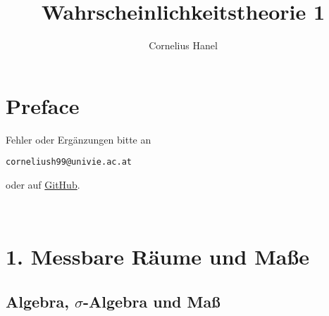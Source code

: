 \documentclass[12pt]{report}
\title{Wahrscheinlichkeitstheorie 1}
\author{Cornelius Hanel}
\begin{document}
\maketitle

\chapter*{Preface}
Fehler oder Erg\"anzungen bitte an
\newline
\begin{center}
    \texttt{corneliush99@univie.ac.at}
\end{center}
oder auf \href{https://github.com/cornelius-qq/probtheory1}{GitHub}.

\tableofcontents


\newcommand{\E}{\mathbb{E}}
\newcommand{\cR}{\mathcal{R}}
\newcommand{\cB}{\mathcal{B}}
\newcommand{\C}{\mathbb{C}}
\newcommand{\del}{\partial}
\newcommand{\A}{\mathcal{A}}
\newcommand{\M}{\mathcal{M}}
\newcommand{\G}{\mathcal{G}}
\renewcommand{\geq}{\geqslant}
\renewcommand{\leq}{\leqslant}
\newcommand{\eps}{\varepsilon}
\newcommand{\Pp}{\mathbb{P}}
\newcommand{\R}{\mathbb{R}}
\newcommand{\Var}{\operatorname{Var}}
\newcommand{\pspace}{(\Omega, \mathcal{A}, \Pp)}
\newcommand{\borel}{\mathcal{B}(\R)}
\newcommand{\ind}[1]{\mathds{1}_{#1}}
\newcommand{\nto}[2]{\xrightarrow[#2]{\makebox[1.5em][c]{$\scriptstyle#1$}}}‌
\newcommand{\krestr}[1]{%
  \sbox{0}{\raisebox{\dimexpr\fontcharht\font`A-\height\relax}{$\big|$}}%
  \usebox{0}%
  \raisebox{\dimexpr-\dp0+\depth\relax}{$\scriptstyle#1$}%
}

\chapter*{1. Messbare R\"aume und Ma\ss{}e}

\section*{Algebra, $\sigma$-Algebra und Ma\ss{}}
\end{document}
